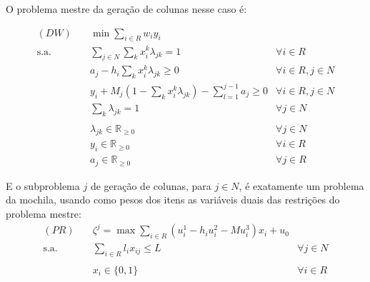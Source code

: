\documentclass{article}
\begin{document}
O problema mestre da geração de colunas nesse caso é:

\begin{align}
    (DW)\quad
     & \min \sum_{i \in R} w_i y_i \nonumber                                                                              \\
    \text{s.a.}\quad
     & \sum_{j \in N} \sum_k x_i^k \lambda_{jk} = 1                                            & \forall i \in R          \\
     & a_j - h_i \sum_k x_i^k \lambda_{jk} \geq 0                                              & \forall i \in R, j \in N \\
     & y_i + M_j \left(1 - \sum_k x_i^k \lambda_{jk} \right) - \sum_{l = 1}^{j - 1} a_j \geq 0 & \forall i \in R, j \in N \\
     & \sum_k \lambda_{jk} = 1                                                                 & \forall j \in N          \\
    \nonumber                                                                                                             \\
     & \lambda_{jk} \in \mathbb{R}_{\geq 0}                                                    & \forall j \in N\nonumber \\
     & y_i \in \mathbb{R}_{\geq 0}                                                             & \forall i \in R\nonumber \\
     & a_j \in \mathbb{R}_{\geq 0}                                                             & \forall j \in R\nonumber
\end{align}

E o subproblema $j$ de geração de colunas, para $j \in N$, é exatamente um problema da mochila, usando como pesos dos itens as variáveis duais das restrições do problema mestre:
\begin{align}
    (PR)\quad
     & \zeta^j = \max \sum_{i \in R} (u^1_i - h_i u^2_i - M u^3_i) x_i + u_0\nonumber                   \\
    \text{s.a.}\quad
     & \sum_{i \in R} l_i x_{ij} \leq L                                               & \forall j \in N \\
    \nonumber                                                                                           \\
     & x_i \in \{0, 1\}                                                               & \forall i \in R
\end{align}
\end{document}
